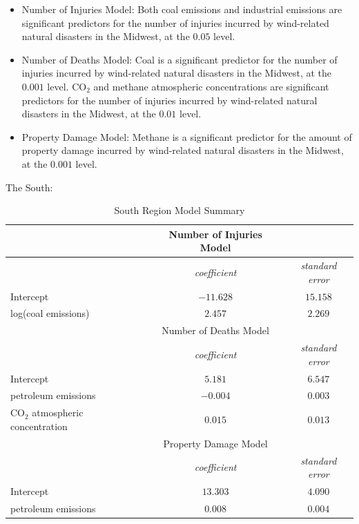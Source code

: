 \documentclass[10pt,]{article}
\begin{document}
\begin{itemize}
  \item Number of Injuries Model: Both coal emissions and industrial emissions are significant predictors for the number of injuries incurred by wind-related natural disasters in the Midwest, at the $0.05$ level.
  \item Number of Deaths Model: Coal is a significant predictor for the number of injuries incurred by wind-related natural disasters in the Midwest, at the $0.001$ level. CO$_2$ and methane atmospheric concentrations are significant predictors for the number of injuries incurred by wind-related natural disasters in the Midwest, at the $0.01$ level.
  \item Property Damage Model: Methane is a significant predictor for the amount of property damage incurred by wind-related natural disasters in the Midwest, at the $0.001$ level.
\end{itemize}

\newpage

The South:

\begin{center}
  \begin{table}[H]
  \caption{\label{tab:table-name}South Region Model Summary}
  \smallskip
  \begin{center}
  \begin{tabular}{|l c c|}
  \hline
   & Number of Injuries Model & \\
  \hline\hline
   & \textit{coefficient} & \textit{standard error} \\ [0.5ex] 
  \hline
  Intercept & $-11.628$ & $15.158$ \\ 
  \hline
  log(coal emissions) & $2.457$ & $2.269$ \\
  \hline\hline
   & Number of Deaths Model & \\
  \hline\hline
   & \textit{coefficient} & \textit{standard error} \\ [0.5ex] 
  \hline
  Intercept & $5.181$ & $6.547$ \\ 
  \hline
  petroleum emissions & $-0.004$ & $0.003$ \\
  \hline
  CO$_2$ atmospheric concentration & $0.015$ & $0.013$ \\
  \hline\hline
   & Property Damage Model & \\
  \hline\hline
   & \textit{coefficient} & \textit{standard error} \\ [0.5ex] 
  \hline
  Intercept & $13.303$ & $4.090$ \\ 
  \hline
  petroleum emissions & $0.008$ & $0.004$ \\
  \hline
  \end{tabular}
  \end{center}
  \end{table}
\end{center}
\end{document}

